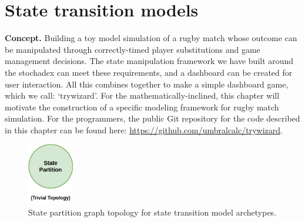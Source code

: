 \chapter{\sffamily State transition models}

{\bfseries\sffamily Concept.} Building a toy model simulation of a rugby match whose outcome can be manipulated through correctly-timed player substitutions and game management decisions. The state manipulation framework we have built around the stochadex can meet these requirements, and a dashboard can be created for user interaction. All this combines together to make a simple dashboard game, which we call: `trywizard'. For the mathematically-inclined, this chapter will motivate the construction of a specific modeling framework for rugby match simulation. For the programmers, the public Git repository for the code described in this chapter can be found here: \href{https://github.com/umbralcalc/trywizard}{https://github.com/umbralcalc/trywizard}.

\begin{figure}[h]
\centering
\includegraphics[width=2cm]{images/chapter-6-state-partition-graph.drawio.png}
\caption{State partition graph topology for state transition model archetypes.}
\label{fig:state-partition-graph-state-transition-models}
\end{figure}
